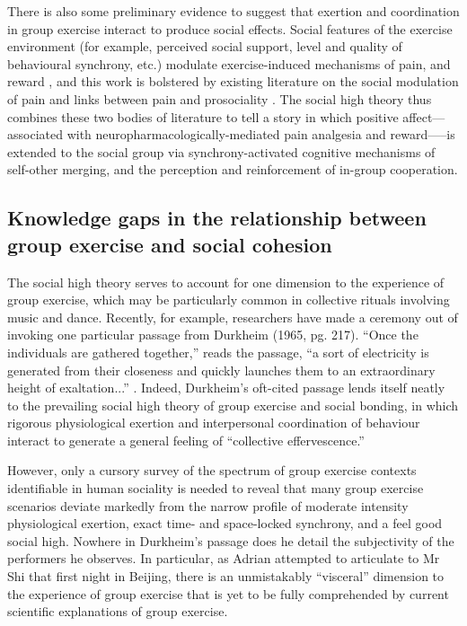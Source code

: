 \begin{CJK}{UTF8}{gbsn}
There is also some preliminary evidence to suggest that exertion and coordination in group exercise interact to produce social effects.  Social features of the exercise environment (for example, perceived social support, level and quality of behavioural synchrony, etc.) modulate exercise-induced mechanisms of pain, and reward \citep{Cohen2009,Sullivan2014,Tarr2015,Davis2015,Weinstein2016}, and this work is bolstered by existing literature on the social modulation of pain \citep{Eisenberger2012a} and links between pain and prosociality \citep{Bastian2014a}.  The social high theory thus combines these two bodies of literature to tell a story in which positive affect---associated with neuropharmacologically-mediated pain analgesia and reward—--is extended to the social group via synchrony-activated cognitive mechanisms of self-other merging, and the perception and reinforcement of in-group cooperation.


\subsection{Knowledge gaps in the relationship between group exercise and social cohesion}

The social high theory serves to account for one dimension to the experience of group exercise, which may be particularly common in collective rituals involving music and dance.  Recently, for example,  researchers have made a ceremony out of invoking one particular passage from Durkheim (1965, pg. 217).  ``Once the individuals are gathered together,'' reads the passage, ``a sort of electricity is generated from their closeness and quickly launches them to an extraordinary height of exaltation...'' \citep{McNeill1995,Konvalinka2011,Fischer2014,Mogan2017}. Indeed,
Durkheim's oft-cited passage lends itself neatly to the prevailing social high theory of group exercise and social bonding, in which rigorous physiological exertion and interpersonal coordination of behaviour interact to generate a general feeling of ``collective effervescence.''

However, only a cursory survey of the spectrum of group exercise contexts identifiable in human sociality is needed to reveal that many group exercise scenarios deviate markedly from the narrow profile of moderate intensity physiological exertion, exact time- and space-locked synchrony, and a feel good social high.  Nowhere in Durkheim's passage does he detail the subjectivity of the performers he observes.  In particular, as Adrian attempted to articulate to Mr Shi that first night in Beijing, there is an unmistakably ``visceral'' dimension to the experience of group exercise that is yet to be fully comprehended by current scientific explanations of group exercise.


\end{CJK}

